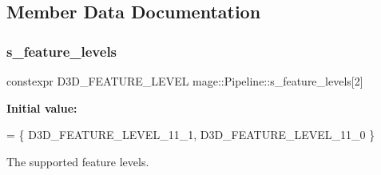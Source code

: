 \subsection{Member Data Documentation}
\hypertarget{structmage_1_1_pipeline_aa451423df031e728f3a3a35bfc942a9b}{}\label{structmage_1_1_pipeline_aa451423df031e728f3a3a35bfc942a9b} 
\subsubsection{\texorpdfstring{s\+\_\+feature\+\_\+levels}{s\_feature\_levels}}
{\footnotesize\ttfamily constexpr D3\+D\+\_\+\+F\+E\+A\+T\+U\+R\+E\+\_\+\+L\+E\+V\+EL mage\+::\+Pipeline\+::s\+\_\+feature\+\_\+levels\mbox{[}2\mbox{]}\hspace{0.3cm}{\ttfamily [static]}}

{\bfseries Initial value\+:}
\begin{DoxyCode}
= \{
            D3D\_FEATURE\_LEVEL\_11\_1,
            D3D\_FEATURE\_LEVEL\_11\_0
        \}
\end{DoxyCode}
The supported feature levels. 